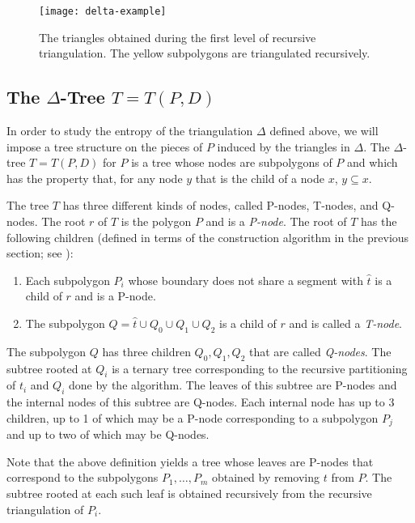 \documentclass[lotsofwhite]{patmorin}
\newcommand{\z}[1]{{\hat{#1}}}
\begin{document}
\begin{figure}
  \begin{center}
      \texttt{[image: delta-example]}
  \end{center}
  \caption{The triangles obtained during the first level of recursive
triangulation.  The yellow subpolygons are triangulated recursively.}
\end{figure}

\subsection{The $\Delta$-Tree $T=T(P,D)$}

In order to study the entropy of the triangulation $\Delta$ defined
above, we will impose a tree structure on the pieces of $P$ induced by
the triangles in $\Delta$.  The $\Delta$-tree $T=T(P,D)$ for $P$ is a
tree whose nodes are subpolygons of $P$ and which has the property
that, for any node $y$ that is the child of a node $x$, $y\subseteq
x$.

The tree $T$ has three different kinds of nodes, called P-nodes,
T-nodes, and Q-nodes.  The root $r$ of $T$ is the polygon $P$ and is
a \emph{P-node}.  The root of $T$ has the following children
(defined in terms of the construction algorithm in the previous
section; see ):

\begin{enumerate}
\item Each subpolygon $P_i$ whose boundary does not share a segment
      with $\z t$ is a child of $r$ and is a P-node.  
\item The subpolygon $Q=\z t\cup Q_0\cup Q_1\cup Q_2$ is a child of $r$ and is
called a \emph{T-node}.
\end{enumerate}

The subpolygon $Q$ has three children $Q_0,Q_1,Q_2$ that are called
\emph{Q-nodes}.  The subtree rooted at $Q_i$ is a ternary tree
corresponding to the recursive partitioning of $t_i$ and $Q_i$ done by
the algorithm. The leaves of this subtree are P-nodes and the internal
nodes of this subtree are Q-nodes.  Each internal node has up to 3
children, up to 1 of which may be a P-node corresponding to a
subpolygon $P_j$ and up to two of which may be Q-nodes.

Note that the above definition yields a tree whose leaves are P-nodes
that correspond to the subpolygons $P_1,\ldots,P_m$  obtained by
removing $t$ from $P$.  The subtree rooted at each such leaf is
obtained recursively from the recursive triangulation of $P_i$.
\end{document}
